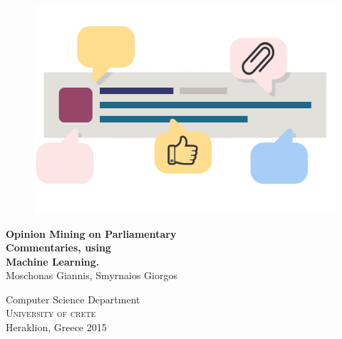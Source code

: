
\begin{titlepage}
			
\addtolength{\voffset}{2cm}

\begin{figure}[H]
\centering
\vspace{1cm}	%
\includegraphics[width=0.9\linewidth]{figure/front_image.png}
\end{figure}

\mbox{}
\vfill
\renewcommand{\familydefault}{\sfdefault} \normalfont %
\textbf{{\huge Opinion Mining on Parliamentary\\Commentaries, using\\Machine Learning.}} 	\\[0.5cm]

{\Large Moschonas Giannis, Smyrnaios Giorgos} \setlength{\parskip}{2.9cm}

Computer Science Department \\
\textsc{University of crete} \\
Heraklion, Greece 2015

\renewcommand{\familydefault}{\rmdefault} \normalfont %
\end{titlepage}


